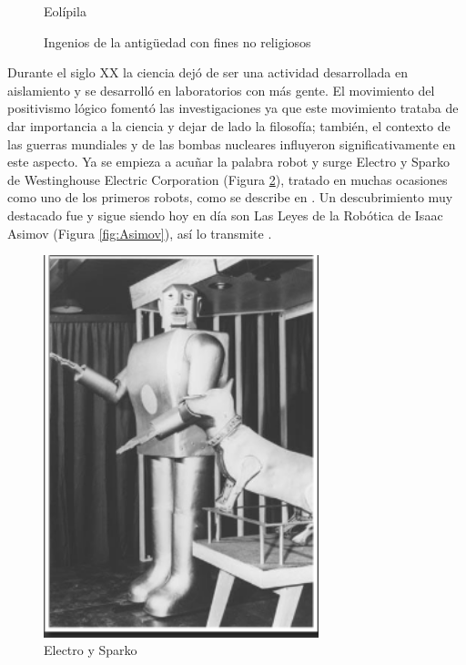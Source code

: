 \begin{figure}[ht!]
\begin{minipage}{0.3\linewidth}
		\caption*{\centering Eolípila} %
	\end{minipage}
	\caption{Ingenios de la antigüedad con fines no religiosos}
    \label{fig:ancient}
    \end{figure}

Durante el siglo XX la ciencia dejó de ser una actividad desarrollada en aislamiento y se desarrolló en laboratorios con más gente. El movimiento del positivismo lógico fomentó las investigaciones ya que este movimiento trataba de dar importancia a la ciencia y dejar de lado la filosofía; también, el contexto de las guerras mundiales y de las bombas nucleares influyeron significativamente en este aspecto. Ya se empieza a acuñar la palabra robot y surge Electro y Sparko de Westinghouse Electric Corporation (Figura \ref{fig:EyS}), tratado en muchas ocasiones como uno de los primeros robots, como se describe en \cite{bidaudrobots}. Un descubrimiento muy destacado fue y sigue siendo hoy en día son Las Leyes de la Robótica de Isaac Asimov (Figura \ref{fig:Asimov}), así lo transmite \cite{barcelo2004nuevo}.\\


\begin{figure} [h!]
	\begin{center}
		\includegraphics[width=8cm]{figs/electro-sparko.png}
	\end{center}
	\caption{Electro y Sparko} %
	\label{fig:EyS}
\end{figure}

